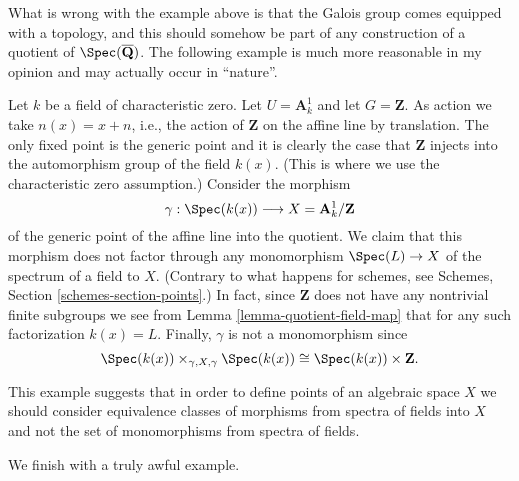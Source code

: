 \noindent
What is wrong with the example above is that
the Galois group comes equipped with a topology,
and this should somehow be part of any construction
of a quotient of $\Spec(\overline{\mathbf{Q}})$.
The following example is much more reasonable in my opinion
and may actually occur in ``nature''.

\begin{example}
\label{example-affine-line-translation}
Let $k$ be a field of characteristic zero.
Let $U = \mathbf{A}^1_k$ and let $G = \mathbf{Z}$.
As action we take $n(x) = x + n$, i.e., the action of
$\mathbf{Z}$ on the affine line by translation.
The only fixed point is the generic point and it
is clearly the case that $\mathbf{Z}$ injects into
the automorphism group of the field $k(x)$. (This is
where we use the characteristic zero assumption.)
Consider the morphism
$$
\gamma : \Spec(k(x)) \longrightarrow X = \mathbf{A}^1_k/\mathbf{Z}
$$
of the generic point of the affine line into the quotient.
We claim that this morphism does not factor through any
monomorphism $\Spec(L) \to X$ of the spectrum of
a field to $X$. (Contrary to what happens for schemes, see
Schemes, Section \ref{schemes-section-points}.) In fact, since
$\mathbf{Z}$ does not have any nontrivial finite subgroups we see from
Lemma \ref{lemma-quotient-field-map} that for any such
factorization $k(x) = L$. Finally, $\gamma$ is not a monomorphism
since
$$
\Spec(k(x)) \times_{\gamma, X, \gamma} \Spec(k(x))
\cong
\Spec(k(x)) \times \mathbf{Z}.
$$
\end{example}

\noindent
This example suggests that in order to define points of an algebraic space
$X$ we should consider equivalence classes of morphisms from spectra
of fields into $X$ and not the set of monomorphisms from spectra of fields.

\medskip\noindent
We finish with a truly awful example.

